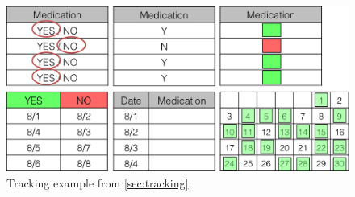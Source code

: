 \documentclass{sig-alternate}
\begin{document}
\begin{figure}
\centering
\includegraphics[width=\linewidth]{img/tracking.png}
\caption{Tracking example from \ref{sec:tracking}.}
\label{fig:tracking}
\end{figure}


\end{document}
